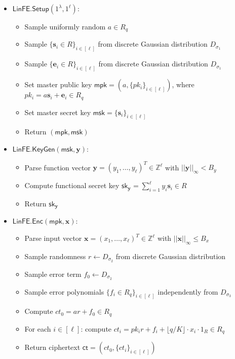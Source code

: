 \begin{itemize}
\item $\mathsf{LinFE.Setup}(1^\lambda, 1^\ell)$:
   \begin{itemize}
       \item Sample uniformly random $a \in R_q$
       \item Sample $\{\mathbf{s}_i \in R\}_{i \in [\ell]}$ from discrete Gaussian distribution $D_{\sigma_1}$
       \item Sample $\{\mathbf{e}_i \in R\}_{i \in [\ell]}$ from discrete Gaussian distribution $D_{\sigma_1}$
       \item Set master public key $\mathsf{mpk} = (a, \{pk_i\}_{i \in [\ell]})$, where $pk_i = a\mathbf{s}_i + \mathbf{e}_i \in R_q$
       \item Set master secret key $\mathsf{msk} = \{\mathbf{s}_i\}_{i \in [\ell]}$
       \item Return $(\mathsf{mpk}, \mathsf{msk})$
   \end{itemize}

\item $\mathsf{LinFE.KeyGen}(\mathsf{msk},\mathbf{y})$:
   \begin{itemize}
       \item Parse function vector $\mathbf{y} = (y_1, \ldots, y_\ell)^T \in \mathbb{Z}^\ell$ with $||\mathbf{y}||_\infty < B_y$
       \item Compute functional secret key $\mathsf{sk}_{\mathbf{y}} = \sum_{i=1}^\ell y_i \mathbf{s}_i \in R$
       \item Return $\mathsf{sk}_{\mathbf{y}}$
   \end{itemize}
   
\item $\mathsf{LinFE.Enc}(\mathsf{mpk},\mathbf{x})$:
   \begin{itemize}
       \item Parse input vector $\mathbf{x} = (x_1, \ldots, x_\ell)^T \in \mathbb{Z}^\ell$ with $||\mathbf{x}||_\infty \leq B_x$
       \item Sample randomness $r \leftarrow D_{\sigma_2}$ from discrete Gaussian distribution
       \item Sample error term $f_0 \leftarrow D_{\sigma_2}$
       \item Sample error polynomials $\{f_i \in R_q \}_{i \in [\ell]}$ independently from $D_{\sigma_3}$
       \item Compute $ct_0 = ar + f_0 \in R_q$
       \item For each $i \in [\ell]$: compute $ct_i = pk_i r + f_i + \lfloor q/K \rfloor \cdot x_i \cdot 1_R \in R_q$
       \item Return ciphertext $\mathsf{ct} = (ct_0, \{ct_i\}_{i \in [\ell]})$
   \end{itemize}
   

\end{itemize}
